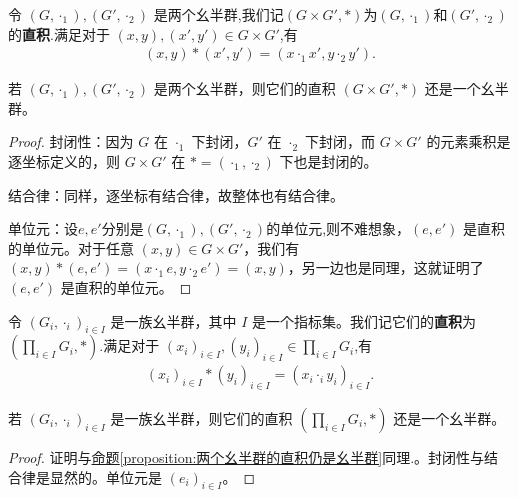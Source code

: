 \documentclass[../../main.tex]{subfiles}
\begin{document}
\begin{definition}[两个幺半群的直积]
令 $(G,\cdot_1),(G',\cdot_2)$ 是两个幺半群,我们记$(G\times G',*)$为$(G,\cdot_1)$和$(G',\cdot_2)$的\textbf{直积}.满足对于 $(x,y),(x',y')\in G\times G'$,有
\begin{align*}
(x,y)*(x',y')=(x\cdot_1 x',y\cdot_2 y').
\end{align*}
\end{definition}

\begin{proposition}[两个幺半群的直积仍是幺半群]\label{proposition:两个幺半群的直积仍是幺半群}
若 $(G,\cdot_1),(G',\cdot_2)$ 是两个幺半群，则它们的直积 $(G\times G',*)$ 还是一个幺半群。
\end{proposition}
\begin{proof}
封闭性：因为 $G$ 在 $\cdot_1$ 下封闭，$G'$ 在 $\cdot_2$ 下封闭，而 $G\times G'$ 的元素乘积是逐坐标定义的，则 $G\times G'$ 在 $* = (\cdot_1,\cdot_2)$ 下也是封闭的。

结合律：同样，逐坐标有结合律，故整体也有结合律。

单位元：设$e,e'$分别是$(G,\cdot_1),(G',\cdot_2)$的单位元,则不难想象，$(e,e')$ 是直积的单位元。对于任意 $(x,y)\in G\times G'$，我们有 $(x,y)*(e,e')=(x\cdot_1 e,y\cdot_2 e')=(x,y)$，另一边也是同理，这就证明了 $(e,e')$ 是直积的单位元。
\end{proof}

\begin{definition}[一族幺半群的直积]
令 $(G_i,\cdot_i)_{i\in I}$ 是一族幺半群，其中 $I$ 是一个指标集。我们记它们的\textbf{直积}为 $(\prod_{i\in I}G_i,*)$.满足对于 $(x_i)_{i\in I},(y_i)_{i\in I}\in\prod_{i\in I}G_i$,有
\begin{align*}
(x_i)_{i\in I}*(y_i)_{i\in I}=(x_i\cdot_i y_i)_{i\in I}.
\end{align*}
\end{definition}

\begin{proposition}[一族幺半群的直积仍是幺半群]\label{proposition:一族幺半群的直积仍是幺半群}
若 $(G_i,\cdot_i)_{i\in I}$ 是一族幺半群，则它们的直积 $(\prod_{i\in I}G_i,*)$ 还是一个幺半群。  
\end{proposition}
\begin{proof}
证明与\hyperref[proposition:两个幺半群的直积仍是幺半群]{命题\ref{proposition:两个幺半群的直积仍是幺半群}}同理.。封闭性与结合律是显然的。单位元是 $(e_i)_{i\in I}$。 
\end{proof}
\end{document}
